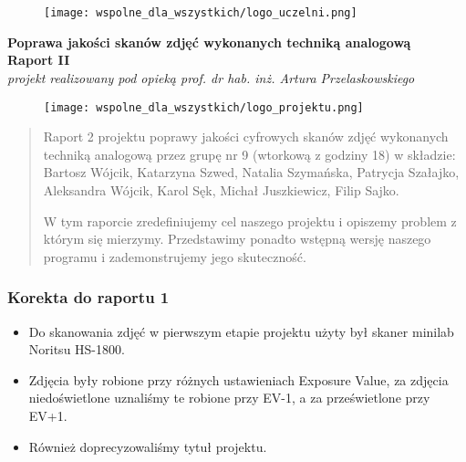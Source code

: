 \documentclass[]{mwart}
\begin{document}
\part{}
\thispagestyle{empty}

\begin{figure}[h]
    \centering
    \texttt{[image: wspolne\_dla\_wszystkich/logo\_uczelni.png]}
\end{figure}


\begin{center}
    {\LARGE \textbf{Poprawa jakości skanów zdjęć wykonanych techniką analogową
        }} \\[0.3cm]
    {\large \textbf{Raport II}} \\[0.2cm]
    \textit{projekt realizowany pod opieką prof. dr hab. inż. Artura Przelaskowskiego}

\end{center}

\begin{figure}[h]
    \centering
    \texttt{[image: wspolne\_dla\_wszystkich/logo\_projektu.png]}
\end{figure}

\vfill
\begin{abstract}
    Raport 2 projektu poprawy jakości cyfrowych skanów zdjęć wykonanych techniką analogową przez grupę nr 9 (wtorkową z godziny 18)
    w składzie:  Bartosz Wójcik, Katarzyna Szwed, Natalia Szymańska,
    Patrycja Szałajko, Aleksandra Wójcik, Karol Sęk, Michał Juszkiewicz, Filip Sajko.

    W tym raporcie zredefiniujemy cel naszego projektu i opiszemy problem z którym się mierzymy.
    Przedstawimy ponadto wstępną wersję naszego programu i zademonstrujemy jego skuteczność.
\end{abstract}


\newpage

\section{Korekta do raportu 1}
\begin{itemize}
    \item Do skanowania zdjęć w pierwszym etapie projektu użyty był skaner minilab Noritsu HS-1800.
    \item Zdjęcia były robione przy różnych ustawieniach Exposure Value, za zdjęcia niedoświetlone uznaliśmy te robione przy EV-1, a za prześwietlone przy EV+1.
    \item Również doprecyzowaliśmy tytuł projektu.
\end{itemize}
\end{document}
